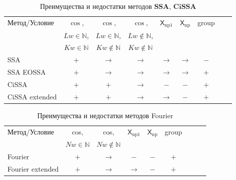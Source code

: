 \documentclass[a4paper, 11pt]{article}
\newcommand{\SSA}{\textbf{SSA}}
\newcommand{\CISSA}{\textbf{CiSSA}}
\newcommand{\TS}{\mathsf{X}}
\begin{document}
\begin{table}[H]
	\caption{Преимущества и недостатки методов $\SSA$, $\CISSA$} 
	\centering
	\begin{center}
		\begin{tabular}{l|cccccccc}
			\hline
			Метод/Условие  & $\cos$,                 & $\cos$,                    & $\cos$,                     & $\TS_{\mathrm{np1}}$   & $\TS_{\mathrm{np}}$ & group\\ 
			& $Lw \in \mathbb N$, & $Lw\in \mathbb N$,    & $Lw \not\in \mathbb N$, &             \\
			& $Kw\in \mathbb N$  & $Kw \not\in \mathbb N$ & $Kw \not\in \mathbb N$  &             \\ 
			\hline
			SSA            & $+$                     & $\to$                      & $\to$                       & $\to$ & $\to$ & $-$ \\
			SSA EOSSA      & $+$                     & $\to$                      & $\to$                       & $\to$ & $\to$ & $+$ \\
			CiSSA          & $+$                     & $+$                        & $\to$                       & $-$   & $-$ & $+$ \\
			CiSSA extended & $+$                     & $+$                        & $\to$                       & $\to$ & $-$ & $+$ \\
			\hline
		\end{tabular}
	\end{center}
	\label{tab:advantages_ssa_cissa}
\end{table}

\begin{table}[H]
	\caption{Преимущества и недостатки методов Fourier} 
	\centering
	\begin{center}
		\begin{tabular}{l|cccccccc}
			\hline
			Метод/Условие  & cos,                 & cos,                  & $\TS_{\mathrm{np1}}$   & $\TS_{\mathrm{np}}$ & group\\ 
			& $Nw \in \mathbb N$ & $Nw \not \in \mathbb N$ \\
			\hline
			Fourier                           & $+$                        & $\to$                       & $-$   & $-$ & $+$ \\
			Fourier extended                         & $+$                        & $\to$                       & $\to$   & $-$ & $+$ \\
			\hline
		\end{tabular}
	\end{center}
	\label{tab:advantages_fourier}
\end{table}
\end{document}

